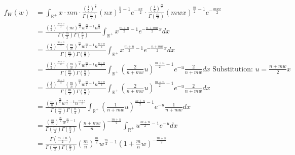 \documentclass[a4paper]{article}
\newcommand{\rbracket}[1]{\left(#1\right)}
\newcommand{\real}[0]{\mathbb{R}} %
\begin{document}
\begin{align*}
	f_W(w) &= \int_{\real^+} x\cdot mn\cdot \frac{\rbracket{\frac{1}{2}}^{\frac{n}{2}}}{\Gamma\rbracket{\frac{n}{2}}}(nx)^{\frac{n}{2}-1}e^{-\frac{nx}{2}}\cdot \frac{\rbracket{\frac{1}{2}}^{\frac{m}{2}}}{\Gamma\rbracket{\frac{m}{2}}}(mwx)^{\frac{m}{2}-1}e^{-\frac{mwx}{2}}\\
	&= \frac{\rbracket{\frac{1}{2}}^{\frac{m+n}{2}}(m)^{\frac{m}{2}}w^{\frac{m}{2}-1}n^{\frac{n}{2}}}{\Gamma\rbracket{\frac{m}{2}}\Gamma\rbracket{\frac{n}{2}}}\int_{\real^+} x^{\frac{m+n}{2}-1}e^{-\frac{n+mw}{2}x}dx\\
	&= \frac{\rbracket{\frac{1}{2}}^{\frac{m+n}{2}}\rbracket{\frac{m}{n}}^{\frac{m}{2}}w^{\frac{m}{2}-1}n^{\frac{m+n}{2}}}{\Gamma\rbracket{\frac{m}{2}}\Gamma\rbracket{\frac{n}{2}}}\int_{\real^+} x^{\frac{m+n}{2}-1}e^{-\frac{n+mw}{2}x}dx\\
	&= \frac{\rbracket{\frac{1}{2}}^{\frac{m+n}{2}}\rbracket{\frac{m}{n}}^{\frac{m}{2}}w^{\frac{m}{2}-1}n^{\frac{m+n}{2}}}{\Gamma\rbracket{\frac{m}{2}}\Gamma\rbracket{\frac{n}{2}}}\int_{\real^+} \rbracket{\frac{2}{n+mw}u}^{\frac{m+n}{2}-1}e^{-u}\frac{2}{n+mw}dx \text{ Substitution: }u=\frac{n+mw}{2}x\\
	&= \frac{\rbracket{\frac{1}{2}}^{\frac{m+n}{2}}\rbracket{\frac{m}{n}}^{\frac{m}{2}}w^{\frac{m}{2}-1}n^{\frac{m+n}{2}}}{\Gamma\rbracket{\frac{m}{2}}\Gamma\rbracket{\frac{n}{2}}}\int_{\real^+} \rbracket{\frac{2}{n+mw}u}^{\frac{m+n}{2}-1}e^{-u}\frac{2}{n+mw}dx\\
	&= \frac{\rbracket{\frac{m}{n}}^{\frac{m}{2}}w^{\frac{m}{2}-1}n^{\frac{m+n}{2}}}{\Gamma\rbracket{\frac{m}{2}}\Gamma\rbracket{\frac{n}{2}}}\int_{\real^+} \rbracket{\frac{1}{n+mw}u}^{\frac{m+n}{2}-1}e^{-u}\frac{1}{n+mw}dx\\
	&= \frac{\rbracket{\frac{m}{n}}^{\frac{m}{2}}w^{\frac{m}{2}-1}}{\Gamma\rbracket{\frac{m}{2}}\Gamma\rbracket{\frac{n}{2}}}\rbracket{\frac{n+mw}{n}}^{-\frac{m+n}{2}}\int_{\real^+} u^{\frac{m+n}{2}-1}e^{-u}dx\\
	&= \frac{\Gamma\rbracket{\frac{m+n}{2}}}{\Gamma\rbracket{\frac{m}{2}}\Gamma\rbracket{\frac{n}{2}}}\rbracket{\frac{m}{n}}^{\frac{m}{2}}w^{\frac{m}{2}-1}\rbracket{1+\frac{m}{n}w}^{-\frac{m+n}{2}}
\end{align*}
\end{document}
